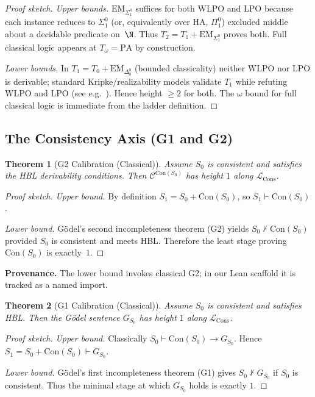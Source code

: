 \documentclass[11pt]{article}
\newtheorem{theorem}{Theorem}[section]
\newcommand{\PA}{\mathrm{PA}}
\newcommand{\HA}{\mathrm{HA}}
\newcommand{\Con}{\mathrm{Con}}
\newcommand{\LCons}{\mathcal{L}_{\mathrm{Cons}}}
\newcommand{\EM}{\mathrm{EM}}
\newcommand{\LPO}{\mathrm{LPO}}
\newcommand{\WLPO}{\mathrm{WLPO}}
\begin{document}
\begin{proof}[Proof sketch]
\emph{Upper bounds.} $\EM_{\Sigma^0_1}$ suffices for both $\WLPO$ and $\LPO$ because each instance
reduces to $\Sigma^0_1$ (or, equivalently over $\HA$, $\Pi^0_1$) excluded middle about a decidable
predicate on~$\N$. Thus $T_2=T_1+\EM_{\Sigma^0_1}$ proves both. Full classical logic appears at
$T_\omega=\PA$ by construction.

\emph{Lower bounds.} In $T_1=T_0+\EM_{\Delta^0_0}$ (bounded classicality) neither $\WLPO$ nor $\LPO$
is derivable; standard Kripke/realizability models validate $T_1$ while refuting $\WLPO$ and $\LPO$
(see e.g.\ \cite[§I.2–I.3]{HajekPudlak}). Hence height $\ge 2$ for both. The $\omega$ bound for full
classical logic is immediate from the ladder definition.
\end{proof}

\subsection{The Consistency Axis (G1 and G2)}
\begin{theorem}[G2 Calibration (Classical)]
Assume $S_0$ is consistent and satisfies the HBL derivability conditions.
Then $\mathcal C^{\Con(S_0)}$ has height $1$ along $\LCons$.
\end{theorem}

\begin{proof}[Proof sketch]
\emph{Upper bound.} By definition $S_1=S_0+\Con(S_0)$, so $S_1\vdash\Con(S_0)$.

\emph{Lower bound.} Gödel's second incompleteness theorem (G2) yields $S_0\nvdash\Con(S_0)$ provided
$S_0$ is consistent and meets HBL. Therefore the least stage proving $\Con(S_0)$ is exactly~$1$.
\end{proof}

\begin{mdframed}[style=provenance]
\textbf{Provenance.} The lower bound invokes classical G2; in our Lean scaffold it is tracked as a named import.
\end{mdframed}

\begin{theorem}[G1 Calibration (Classical)]
Assume $S_0$ is consistent and satisfies HBL. Then the Gödel sentence $G_{S_0}$
has height $1$ along $\LCons$.
\end{theorem}

\begin{proof}[Proof sketch]
\emph{Upper bound.} Classically $S_0\vdash \Con(S_0)\to G_{S_0}$. Hence $S_1=S_0+\Con(S_0)\vdash G_{S_0}$.

\emph{Lower bound.} Gödel's first incompleteness theorem (G1) gives $S_0\nvdash G_{S_0}$ if $S_0$ is consistent.
Thus the minimal stage at which $G_{S_0}$ holds is exactly $1$.
\end{proof}
\end{document}
